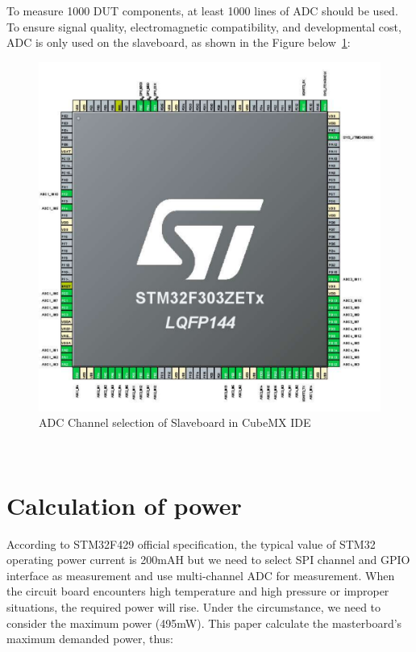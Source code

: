 To measure 1000 DUT components, at least 1000 lines of ADC should be used. To ensure signal quality, electromagnetic compatibility, and developmental cost, ADC is only used on the slaveboard, as shown in the Figure below~\ref{fig:4.3}: 

\begin{figure}[!ht]
	\centering
	\includegraphics[width=16cm]{grafiken/4.3.pdf}
	\caption{ADC Channel selection of Slaveboard in CubeMX IDE} 
	\label{fig:4.3}
\end{figure}
\FloatBarrier
\\

\section{Calculation of power}
\label{sec:Calculation of power}
According to STM32F429 official specification, the typical value of STM32 operating power current is 200mAH but we need to select SPI channel and GPIO interface as measurement and use multi-channel ADC for measurement. When the circuit board encounters high temperature and high pressure or improper situations, the required power will rise. Under the circumstance, we need to consider the maximum power (495mW). 
This paper calculate the masterboard’s maximum demanded power, thus:

